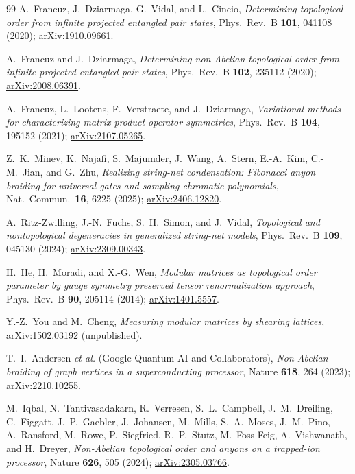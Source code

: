 \documentclass[aps,pra,twocolumn,superscriptaddress,longbibliography,floatfix,nofootinbib]{revtex4-2}
\begin{document}
\begin{thebibliography}{99}
A.~Francuz, J.~Dziarmaga, G.~Vidal, and L.~Cincio,
\emph{Determining topological order from infinite projected entangled pair
states},
Phys.\ Rev.\ B \textbf{101}, 041108 (2020);
\href{https://arxiv.org/abs/1910.09661}{arXiv:1910.09661}.

A.~Francuz and J.~Dziarmaga,
\emph{Determining non-Abelian topological order from infinite projected
entangled pair states},
Phys.\ Rev.\ B \textbf{102}, 235112 (2020);
\href{https://arxiv.org/abs/2008.06391}{arXiv:2008.06391}.

A.~Francuz, L.~Lootens, F.~Verstraete, and J.~Dziarmaga,
\emph{Variational methods for characterizing matrix product operator
symmetries},
Phys.\ Rev.\ B \textbf{104}, 195152 (2021);
\href{https://arxiv.org/abs/2107.05265}{arXiv:2107.05265}.

Z.~K.~Minev, K.~Najafi, S.~Majumder, J.~Wang, A.~Stern, E.-A.~Kim, C.-M.~Jian,
and G.~Zhu,
\emph{Realizing string-net condensation: Fibonacci anyon braiding for universal
gates and sampling chromatic polynomials},
Nat.\ Commun.\ \textbf{16}, 6225 (2025);
\href{https://arxiv.org/abs/2406.12820}{arXiv:2406.12820}.

A.~Ritz-Zwilling, J.-N.~Fuchs, S.~H.~Simon, and J.~Vidal,
\emph{Topological and nontopological degeneracies in generalized string-net
models},
Phys.\ Rev.\ B \textbf{109}, 045130 (2024);
\href{https://arxiv.org/abs/2309.00343}{arXiv:2309.00343}.

H.~He, H.~Moradi, and X.-G.~Wen,
\emph{Modular matrices as topological order parameter by gauge symmetry
preserved tensor renormalization approach},
Phys.\ Rev.\ B \textbf{90}, 205114 (2014);
\href{https://arxiv.org/abs/1401.5557}{arXiv:1401.5557}.

Y.-Z.~You and M.~Cheng,
\emph{Measuring modular matrices by shearing lattices},
\href{https://arxiv.org/abs/1502.03192}{arXiv:1502.03192} (unpublished).

T.~I.~Andersen \emph{et al.} (Google Quantum AI and Collaborators),
\emph{Non-Abelian braiding of graph vertices in a superconducting processor},
Nature \textbf{618}, 264 (2023);
\href{https://arxiv.org/abs/2210.10255}{arXiv:2210.10255}.

M.~Iqbal, N.~Tantivasadakarn, R.~Verresen, S.~L.~Campbell, J.~M.~Dreiling,
C.~Figgatt, J.~P.~Gaebler, J.~Johansen, M.~Mills, S.~A.~Moses, J.~M.~Pino,
A.~Ransford, M.~Rowe, P.~Siegfried, R.~P.~Stutz, M.~Foss-Feig,
A.~Vishwanath, and H.~Dreyer,
\emph{Non-Abelian topological order and anyons on a trapped-ion processor},
Nature \textbf{626}, 505 (2024);
\href{https://arxiv.org/abs/2305.03766}{arXiv:2305.03766}.


\end{thebibliography}
\end{document}
